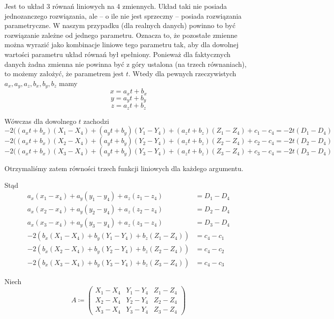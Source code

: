 \documentclass{article}
\begin{document}
\noindent Jest to układ 3 równań liniowych na 4 zmiennych. Układ taki nie posiada jednozanczego rozwiązania,
ale -- o ile nie jest sprzeczny -- posiada rozwiązania parametryczne. W naszym przypadku (dla realnych danych)
powinno to być rozwiązanie zależne od jednego parametru. Oznacza to, że pozostałe zmienne można wyrazić
jako kombinacje liniowe tego parametru tak, aby dla dowolnej wartości parametru układ równań był spełniony.
Ponieważ dla faktycznych danych żadna zmienna nie powinna być z góry ustalona (na trzech równaniach),
to możemy założyć, że parametrem jest $t$. Wtedy dla pewnych rzeczywistych $a_x, a_y, a_z, b_x, b_y, b_z$ mamy
$$x = a_xt + b_x $$
$$y = a_yt + b_y $$
$$z = a_zt + b_z $$

\noindent Wówczas dla dowolnego $t$ zachodzi
$$-2( (a_xt+b_x)(X_1-X_4) + (a_yt+b_y)(Y_1-Y_4) + (a_zt+b_z)(Z_1-Z_4) + c_1 - c_4 =-2t(D_1-D_4) $$
$$-2( (a_xt+b_x)(X_2-X_4) + (a_yt+b_y)(Y_2-Y_4) + (a_zt+b_z)(Z_2-Z_4) + c_2 - c_4 =-2t(D_2-D_4) $$
$$-2( (a_xt+b_x)(X_3-X_4) + (a_yt+b_y)(Y_3-Y_4) + (a_zt+b_z)(Z_3-Z_4) + c_3 - c_4 =-2t(D_3-D_4) $$

\noindent Otrzymaliśmy zatem równości trzech funkcji liniowych dla każdego argumentu.

\noindent Stąd
\begin{equation}
\begin{aligned}
    a_x(x_1-x_4) + a_y(y_1-y_4) + a_z(z_1-z_4) &= D_1-D_4 \\
    a_x(x_2-x_4) + a_y(y_2-y_4) + a_z(z_2-z_4) &= D_2-D_4 \\
    a_x(x_3-x_4) + a_y(y_3-y_4) + a_z(z_3-z_4) &= D_3-D_4 \\
    -2(b_x(X_1-X_4)+b_y(Y_1-Y_4)+b_z(Z_1-Z_4)) &= c_4-c_1 \\
    -2(b_x(X_2-X_4)+b_y(Y_2-Y_4)+b_z(Z_2-Z_4)) &= c_4-c_2 \\
    -2(b_x(X_3-X_4)+b_y(Y_3-Y_4)+b_z(Z_3-Z_4)) &= c_4-c_3
\end{aligned}
\end{equation}

\noindent Niech
\[
A \coloneqq
\begin{pmatrix}
X_1-X_4 & Y_1-Y_4 & Z_1-Z_4 \\
X_2-X_4 & Y_2-Y_4 & Z_2-Z_4 \\
X_3-X_4 & Y_3-Y_4 & Z_3-Z_4
\end{pmatrix}
\]
\end{document}
